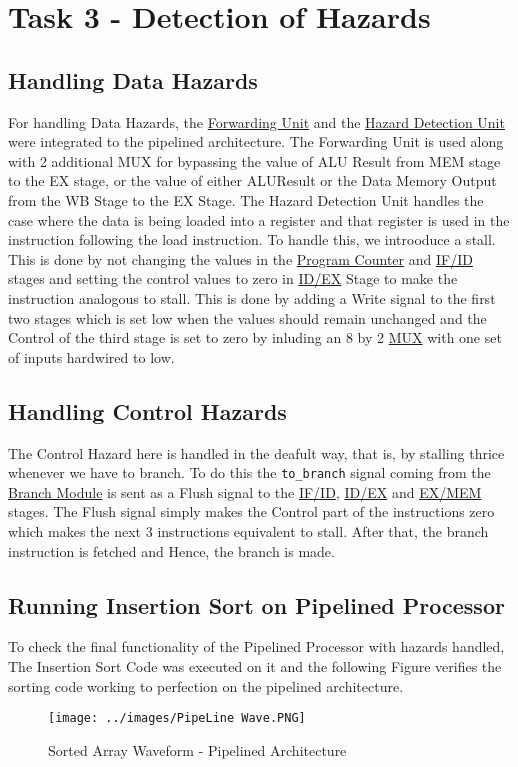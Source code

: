 \documentclass[12pt]{article}
\begin{document}
\section*{\Huge Task 3 - Detection of Hazards}
\subsection*{\Large Handling Data Hazards}
For handling Data Hazards, the \hyperref[forward]{Forwarding Unit} and the \hyperref[hdu]{Hazard Detection Unit} were integrated to the pipelined architecture. The Forwarding Unit is used along with 2 additional MUX for bypassing the value of ALU Result from MEM stage to the EX stage, or the value of either ALUResult or the Data Memory Output from the WB Stage to the EX Stage. The Hazard Detection Unit handles the case where the data is being loaded into a register and that register is used in the instruction following the load instruction. To handle this, we introoduce a stall. This is done by not changing the values in the \hyperref[pc]{Program Counter} and \hyperref[if_id]{IF/ID} stages and setting the control values to zero in \hyperref[id_ex]{ID/EX} Stage to make the instruction analogous to stall. This is done by adding a Write signal to the first two stages which is set low when the values should remain unchanged and the Control of the third stage is set to zero by inluding an 8 by 2 \hyperref[muxc]{MUX} with one set of inputs hardwired to low.
\subsection*{\Large Handling Control Hazards}
The Control Hazard here is handled in the deafult way, that is, by stalling thrice whenever we have to branch. To do this the \texttt{to\_branch} signal coming from the \hyperref[branch_module]{Branch Module} is sent as a Flush signal to the \hyperref[if_id]{IF/ID}, \hyperref[id_ex]{ID/EX} and \hyperref[ex_mem]{EX/MEM} stages. The Flush signal simply makes the Control part of the instructions zero which makes the next 3 instructions equivalent to stall. After that, the branch instruction is fetched and Hence, the branch is made.
\subsection*{\Large Running Insertion Sort on Pipelined Processor}
To check the final functionality of the Pipelined Processor with hazards handled, The Insertion Sort Code was executed on it and the following Figure verifies the sorting code working to perfection on the pipelined architecture.
\begin{figure}[H]
    \centering
    \texttt{[image: ../images/PipeLine Wave.PNG]}
    \label{img6}
    \caption{Sorted Array Waveform - Pipelined Architecture}
\end{figure}
\end{document}
